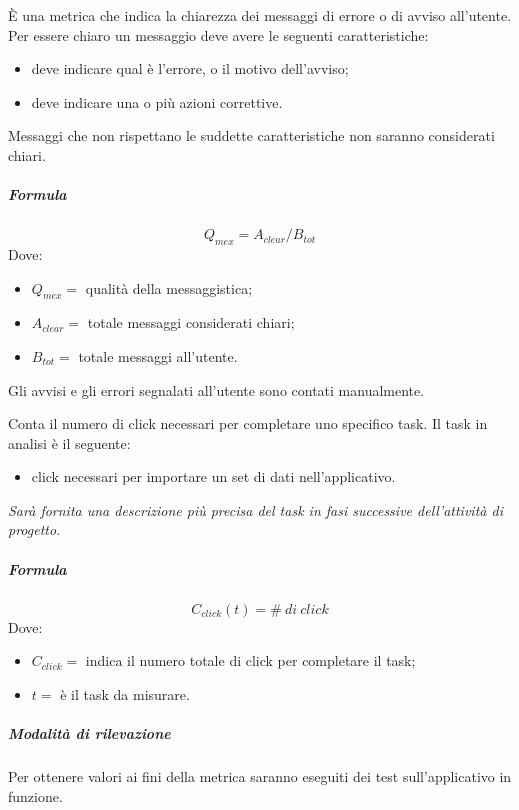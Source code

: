         È una metrica che indica la chiarezza dei messaggi di errore o di avviso 
        all'utente. Per essere chiaro un messaggio deve avere le seguenti 
        caratteristiche:
        \begin{itemize}
          \item deve indicare qual è l'errore, o il motivo dell'avviso;
          \item deve indicare una o più azioni correttive.
        \end{itemize}
        Messaggi che non rispettano le suddette caratteristiche non saranno considerati 
        chiari.
        \subparagraph{Formula}
        \begin{displaymath}
          Q_{mex} = A_{clear}/B_{tot}
        \end{displaymath}
        Dove:
        \begin{itemize}
          \item[] $Q_{mex} =$ qualità della messaggistica;
          \item[] $A_{clear} =$ totale messaggi considerati chiari; 
          \item[] $B_{tot} =$ totale messaggi all'utente.
        \end{itemize}
        Gli avvisi e gli errori segnalati all'utente sono contati manualmente.
        
        Conta il numero di click necessari per completare uno specifico task. Il task 
        in analisi è il seguente: 
        \begin{itemize}
          \item click necessari per importare un set di dati nell'applicativo.
        \end{itemize}
        \textit{Sarà fornita una descrizione più precisa del task in fasi successive 
        dell'attività di progetto.}
        \subparagraph{Formula}
        \begin{displaymath}
          C_{click}(t) = \#\ di\ click
        \end{displaymath}
        Dove:
        \begin{itemize}
          \item[] $C_{click} =$ indica il numero totale di click per completare il 
        task; 
          \item[] $t =$ è il task da misurare.
        \end{itemize}
        \subparagraph{Modalità di rilevazione}
        Per ottenere valori ai fini della metrica saranno eseguiti dei test 
        sull'applicativo in funzione.
        
